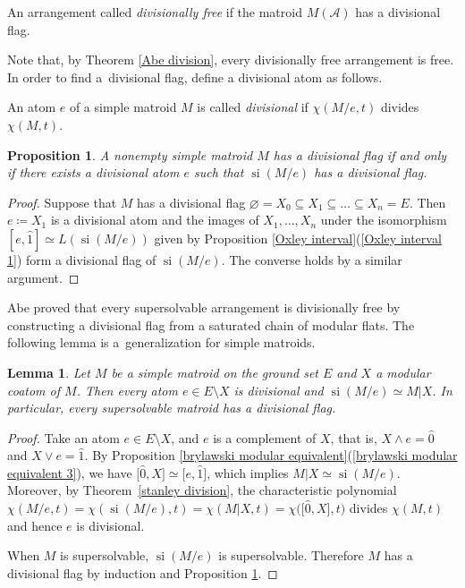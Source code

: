 \documentclass[pdftex]{sigma}
\numberwithin{equation}{section}
\newtheorem{Lemma}[Theorem]{Lemma}
\newtheorem{Proposition}[Theorem]{Proposition}
 { \theoremstyle{definition}
\newtheorem{Definition}[Theorem]{Definition}
\newtheorem{Example}[Theorem]{Example}
\newtheorem{Remark}[Theorem]{Remark}
\newtheorem{Question}[Theorem]{Question} }
\DeclareMathOperator{\si}{si}
\begin{document}
\begin{Definition}\label{definition divisional freeness}
An arrangement called \textit{divisionally free} if the matroid $ M(\mathcal{A}) $ has a divisional flag.
\end{Definition}
Note that, by Theorem \ref{Abe division}, every divisionally free arrangement is free. In order to find a~divisional flag, define a divisional atom as follows.

\begin{Definition}An atom $ e $ of a simple matroid $ M $ is called \textit{divisional} if $ \chi(M/e,t) $ divides $ \chi(M,t) $.
\end{Definition}

\begin{Proposition}\label{divisional flag}
A nonempty simple matroid $ M $ has a divisional flag if and only if there exists a divisional atom $ e $ such that $ \si(M/e) $ has a divisional flag.
\end{Proposition}
\begin{proof}
Suppose that $ M $ has a divisional flag $ \varnothing = X_{0} \subseteq X_{1} \subseteq \dots \subseteq X_{n} = E $.
Then $ e \coloneqq X_{1} $ is a divisional atom and the images of $ X_{1}, \dots, X_{n} $ under the isomorphism $ [e, \hat{1}] \simeq L(\si(M/e)) $ given by Proposition \ref{Oxley interval}(\ref{Oxley interval 1}) form a divisional flag of $ \si(M/e) $.
The converse holds by a similar argument.
\end{proof}

Abe \cite[Proposition 5]{abe2017restrictions-pilt} proved that every supersolvable arrangement is divisionally free by constructing a divisional flag from a saturated chain of modular flats. The following lemma is a~generalization for simple matroids.

\begin{Lemma}\label{modular coatom divisional}
Let $ M $ be a simple matroid on the ground set $ E $ and $ X $ a modular coatom of $ M $.
Then every atom $ e \in E \setminus X $ is divisional and $ \si(M/e) \simeq M|X $.
In particular, every supersolvable matroid has a divisional flag.
\end{Lemma}
\begin{proof}
Take an atom $ e \in E\setminus X $, and $ e $ is a complement of $ X $, that is, $ X \wedge e = \hat{0} $ and $ X \vee e = \hat{1} $.
By Proposition \ref{brylawski modular equivalent}(\ref{brylawski modular equivalent 3}), we have $ \big[\hat{0}, X\big] \simeq \big[e, \hat{1}\big] $, which implies $ M|X \simeq \si(M/e) $.
Moreover, by Theo\-rem~\ref{stanley division}, the characteristic polynomial $ \chi(M/e,t) = \chi(\si(M/e),t) = \chi(M|X,t) = \chi\big(\big[\hat{0}, X\big], t\big) $ divides $ \chi(M,t) $ and hence $ e $ is divisional.

When $ M $ is supersolvable, $ \si(M/e) $ is supersolvable.
Therefore $ M $ has a divisional flag by induction and Proposition \ref{divisional flag}.
\end{proof}
\end{document}
